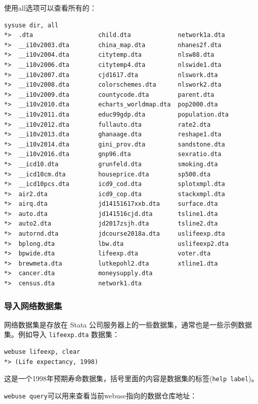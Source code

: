 使用all选项可以查看所有的：

\begin{lstlisting}
sysuse dir, all
*>  .dta                  child.dta             network1a.dta
*>  __i10v2003.dta        china_map.dta         nhanes2f.dta
*>  __i10v2004.dta        citytemp.dta          nlsw88.dta
*>  __i10v2006.dta        citytemp4.dta         nlswide1.dta
*>  __i10v2007.dta        cjd1617.dta           nlswork.dta
*>  __i10v2008.dta        colorschemes.dta      nlswork2.dta
*>  __i10v2009.dta        countycode.dta        parent.dta
*>  __i10v2010.dta        echarts_worldmap.dta  pop2000.dta
*>  __i10v2011.dta        educ99gdp.dta         population.dta
*>  __i10v2012.dta        fullauto.dta          rate2.dta
*>  __i10v2013.dta        ghanaage.dta          reshape1.dta
*>  __i10v2014.dta        gini_prov.dta         sandstone.dta
*>  __i10v2016.dta        gnp96.dta             sexratio.dta
*>  __icd10.dta           grunfeld.dta          smoking.dta
*>  __icd10cm.dta         houseprice.dta        sp500.dta
*>  __icd10pcs.dta        icd9_cod.dta          splotxmpl.dta
*>  air2.dta              icd9_cop.dta          stackxmpl.dta
*>  airq.dta              jd14151617xxb.dta     surface.dta
*>  auto.dta              jd141516cjd.dta       tsline1.dta
*>  auto2.dta             jd2017zsjh.dta        tsline2.dta
*>  autornd.dta           jdcourse2018a.dta     uslifeexp.dta
*>  bplong.dta            lbw.dta               uslifeexp2.dta
*>  bpwide.dta            lifeexp.dta           voter.dta
*>  brewmeta.dta          lutkepohl2.dta        xtline1.dta
*>  cancer.dta            moneysupply.dta
*>  census.dta            network1.dta
\end{lstlisting}

\subsubsection{导入网络数据集}

网络数据集是存放在 Stata 公司服务器上的一些数据集，通常也是一些示例数据集。例如导入 \texttt{lifeexp.dta} 数据集：

\begin{lstlisting}
webuse lifeexp, clear
*> (Life expectancy, 1998)
\end{lstlisting}

这是一个1998年预期寿命数据集，括号里面的内容是数据集的标签(\lstinline{help label})。

\lstinline{webuse query}可以用来查看当前webuse指向的数据仓库地址：

